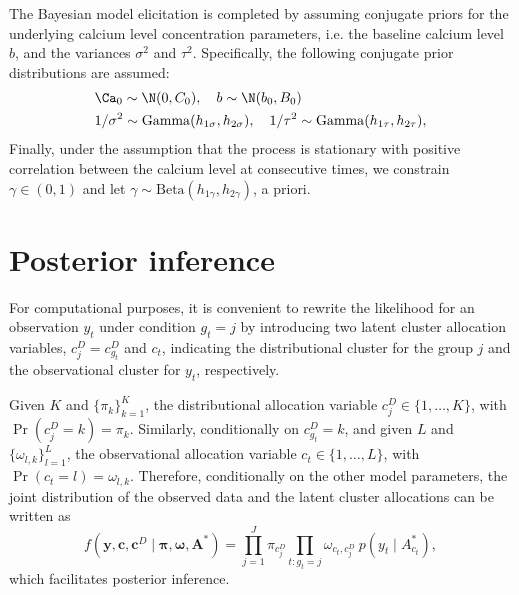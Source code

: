 The Bayesian model elicitation is completed by assuming conjugate priors for the underlying calcium level concentration parameters, i.e. the baseline calcium level $b$, and the variances $\sigma^2$ and $\tau^2$.  Specifically, the following conjugate prior distributions are assumed:
\begin{eqnarray*}
	&\Ca_0 \sim \N(0,C_0), \quad b\sim \N(b_0,B_0) \\ 
	&1/\sigma^2 \sim \mathrm{Gamma}(h_{1\sigma},h_{2\sigma}),\quad 
	1/\tau^2 \sim \mathrm{Gamma}(h_{1\tau},h_{2\tau}),
\end{eqnarray*}
Finally, under the assumption that the process is stationary with positive correlation between the calcium level at consecutive times, we constrain $\gamma \in (0,1)$ and let $\gamma\sim \mathrm{Beta}(h_{1\gamma}, h_{2\gamma})$, a priori.



\section{Posterior inference}
\label{s:posterior_inference}

For computational purposes, it is convenient to rewrite the likelihood for an observation $y_t$ under condition $g_t=j$ by introducing two latent cluster allocation variables, $c^D_j = c^D_{g_t}$ and $c_t$, indicating the distributional cluster for the group $j$ and the observational cluster for $y_t$, respectively. 

Given $K$ and $\{\pi_k\}_{k=1}^K$, the distributional allocation variable $c^D_j\in\{1,\dots,K\}$, with $\Pr(c^D_j = k) = \pi_k$. Similarly, conditionally on $c^D_{g_t} =k$, and given $L$ and $\{\omega_{l,k}\}_{l=1}^L$, the observational allocation variable $c_t \in \{1,\dots,L\}$, with $\Pr(c_t = l) = \omega_{l,k}$. 
Therefore, conditionally on the other model parameters, the joint distribution of the observed data and the latent cluster allocations can be written as
\begin{equation*}
f(\bm{y},\bm{c},\bm{c}^D\mid \bm{\pi}, \bm{\omega}, \bm{A}^*) = \prod_{j=1}^J \pi_{c^D_j} \prod_{t:g_t = j} \omega_{c_t,c^D_j}\: p(y_t\mid A^*_{c_t}),
\end{equation*}
which facilitates posterior inference. 

